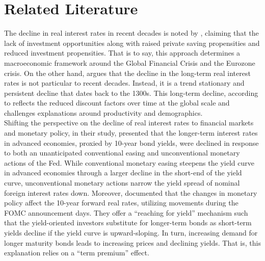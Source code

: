 \section{Related Literature}

The decline in real interest rates in recent decades is noted by \citet{summers2014reflections}, claiming that the lack of investment opportunities along with raised private saving propensities and reduced investment propensities. That is to say, this approach determines a macroeconomic framework around the Global Financial Crisis and the Eurozone crisis. On the other hand, \citet{rogoff2022} argues that the decline in the long-term real interest rates is not particular to recent decades. Instead, it is a trend stationary and persistent decline that dates back to the 1300s. This long-term decline, according to \citet{rogoff2022} reflects the reduced discount factors over time at the global scale and challenges explanations around productivity and demographics. \\

Shifting the perspective on the decline of real interest rates to financial markets and monetary policy, in their study, \citet{gilchrist2014us} presented that the longer-term interest rates in advanced economies, proxied by 10-year bond yields, were declined in response to both an unanticipated conventional easing and unconventional monetary actions of the Fed. While conventional monetary easing steepens the yield curve in advanced economies through a larger decline in the short-end of the yield curve, unconventional monetary actions narrow the yield spread of nominal foreign interest rates down. Moreover, \citet{hanson2015monetary} documented that the changes in monetary policy affect the 10-year forward real rates, utilizing movements during the FOMC announcement days. They offer a ``reaching for yield'' mechanism such that the yield-oriented investors substitute for longer-term bonds as short-term yields decline if the yield curve is upward-sloping. In turn, increasing demand for longer maturity bonds leads to increasing prices and declining yields. That is, this explanation relies on a ``term premium'' effect. \citep{hanson2015monetary}\\




